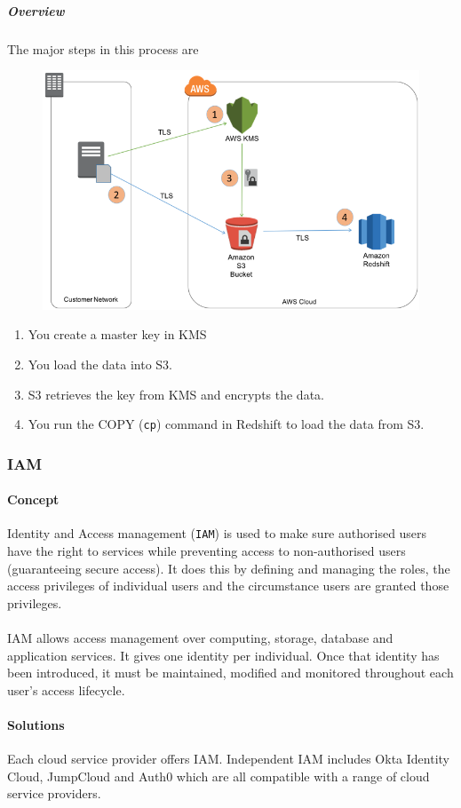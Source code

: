 \documentclass[10pt]{article}
\begin{document}
\begin{samepage}
\subparagraph{Overview} 
The major steps in this process are
\begin{figure}[h!]
	\centering
	\includegraphics[width=0.7\linewidth]{images/EcryptionOverview.PNG}	
\end{figure}
\nopagebreak
\begin{enumerate}
  \item You create a master key in KMS
  \item You load the data into S3.
  \item S3 retrieves the key from KMS and encrypts the data.
  \item You run the COPY (\texttt{cp}) command in Redshift to load the data from S3.
\end{enumerate}
\end{samepage}

\subsubsection{IAM}
\paragraph{Concept}
Identity and Access management (\texttt{IAM}) is used to make sure authorised users have the right to services while preventing access to non-authorised users (guaranteeing secure access). It does this by defining and managing the roles, the access privileges of individual users and the circumstance users are granted those privileges.
\\ \\
IAM allows access management over computing, storage, database and application services. It gives one identity per individual. Once that identity has been introduced, it must be maintained, modified and monitored throughout each user’s access lifecycle. \cite{iam}
\paragraph{Solutions}
Each cloud service provider offers IAM. Independent IAM includes Okta Identity Cloud, JumpCloud and Auth0 which are all compatible with a range of cloud service providers.
\end{document}
